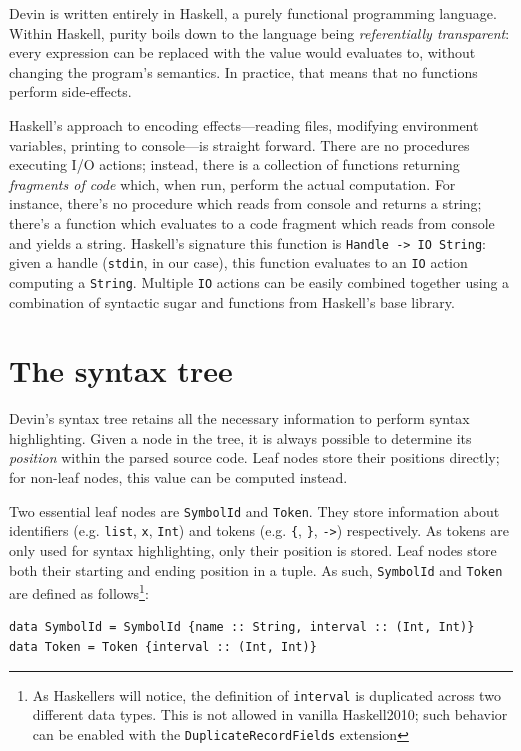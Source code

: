 \documentclass[11pt, american, draft]{PhdThesis}
\begin{document}
  Devin is written entirely in Haskell, a purely functional programming language. Within Haskell,
  purity boils down to the language being \emph{referentially transparent}: every expression can
  be replaced with the value would evaluates to, without changing the program's semantics. In
  practice, that means that no functions perform side-effects.

  Haskell's approach to encoding effects---reading files, modifying environment variables, printing
  to console---is straight forward. There are no procedures executing I/O actions; instead, there
  is a collection of functions returning \emph{fragments of code} which, when run, perform the
  actual computation. For instance, there's no procedure which reads from console and returns a
  string; there's a function which evaluates to a code fragment which reads from console and yields
  a string. Haskell's signature this function is \verb$Handle -> IO String$: given a handle
  (\verb$stdin$, in our case), this function evaluates to an \verb$IO$ action computing a
  \verb$String$. Multiple \verb$IO$ actions can be easily combined together using a combination of
  syntactic sugar and functions from Haskell's base library.

  \section{The syntax tree}

  Devin's syntax tree retains all the necessary information to perform syntax highlighting. Given a
  node in the tree, it is always possible to determine its \emph{position} within the parsed source
  code. Leaf nodes store their positions directly; for non-leaf nodes, this value can be computed
  instead.

  Two essential leaf nodes are \verb$SymbolId$ and \verb$Token$. They store information about
  identifiers (e.g. \verb$list$, \verb$x$, \verb$Int$) and tokens (e.g. \verb${$, \verb$}$, \verb$->$)
  respectively. As tokens are only used for syntax highlighting, only their position is stored.
  Leaf nodes store both their starting and ending position in a tuple. As such, \verb$SymbolId$ and
  \verb$Token$ are defined as follows\footnote{As Haskellers will notice, the definition of
  \mbox{\texttt{interval}} is duplicated across two different data types. This is not allowed in
  vanilla Haskell2010; such behavior can be enabled with the \mbox{\texttt{DuplicateRecordFields}}
  extension}:

\begin{verbatim}
data SymbolId = SymbolId {name :: String, interval :: (Int, Int)}
data Token = Token {interval :: (Int, Int)}
\end{verbatim}
\end{document}
